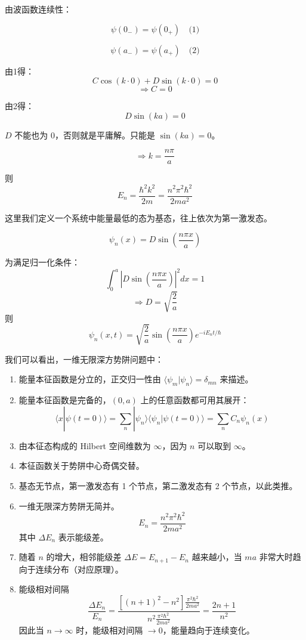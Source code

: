 \documentclass[lang=cn,10pt]{elegantbook}
\begin{document}
由波函数连续性：

\begin{equation*}
	\psi(0_-) = \psi(0_+) \quad \text{(1)}
\end{equation*}

\begin{equation*}
	\psi(a_-) = \psi(a_+) \quad \text{(2)}
\end{equation*}

由1得：
\[
C\cos(k \cdot 0) + D\sin(k \cdot 0) = 0
\]
\[
\Rightarrow C = 0
\]

由2得：
\[
D\sin(ka) = 0
\]

\(D\) 不能也为 0，否则就是平庸解。只能是 \(\sin(ka) = 0\)。

\[
\Rightarrow k = \frac{n\pi}{a}
\]

则
\[
E_n = \frac{\hbar^2 k^2}{2m} = \frac{n^2 \pi^2 \hbar^2}{2ma^2}
\]

这里我们定义一个系统中能量最低的态为基态，往上依次为第一激发态。

\[
\psi_n(x) = D\sin\left(\frac{n\pi x}{a}\right)
\]

为满足归一化条件：
\[
\int_0^a \left|D\sin\left(\frac{n\pi x}{a}\right)\right|^2 dx = 1
\]
\[
\Rightarrow D = \sqrt{\frac{2}{a}}
\]
则
\[
\psi_n(x,t) = \sqrt{\frac{2}{a}} \sin\left(\frac{n\pi x}{a}\right) e^{-iE_n t/\hbar}
\]

我们可以看出，一维无限深方势阱问题中：

\begin{enumerate}
	\item 能量本征函数是分立的，正交归一性由 $\langle \psi_m | \psi_n \rangle = \delta_{mn}$ 来描述。
	\item 能量本征函数是完备的，$(0, a)$ 上的任意函数都可用其展开：
	\[
	\langle x | \psi(t=0) \rangle = \sum_n | \psi_n \rangle \langle \psi_n | \psi(t=0) \rangle = \sum_n C_n \psi_n(x)
	\]
	\item 由本征态构成的 Hilbert 空间维数为 $\infty$，因为 $n$ 可以取到 $\infty$。
	\item 本征函数关于势阱中心奇偶交替。
	\item 基态无节点，第一激发态有 1 个节点，第二激发态有 2 个节点，以此类推。
	\item 一维无限深方势阱无简并。
	\[
	E_n = \frac{n^2 \pi^2 \hbar^2}{2ma^2}
	\]
	其中 $\Delta E_n$ 表示能级差。
	
	\item 随着 $n$ 的增大，相邻能级差 $\Delta E = E_{n+1} - E_n$ 越来越小，当 $ma$ 非常大时趋向于连续分布（对应原理）。
	
	\item 能级相对间隔
	\[
	\frac{\Delta E_n}{E_n} = \frac{\left[(n+1)^2 - n^2\right] \frac{\pi^2 \hbar^2}{2ma^2}}{n^2 \frac{\pi^2 \hbar^2}{2ma^2}} = \frac{2n+1}{n^2}
	\]
	因此当 $n \rightarrow \infty$ 时，能级相对间隔 $\rightarrow 0$，能量趋向于连续变化。
\end{enumerate}
\end{document}
